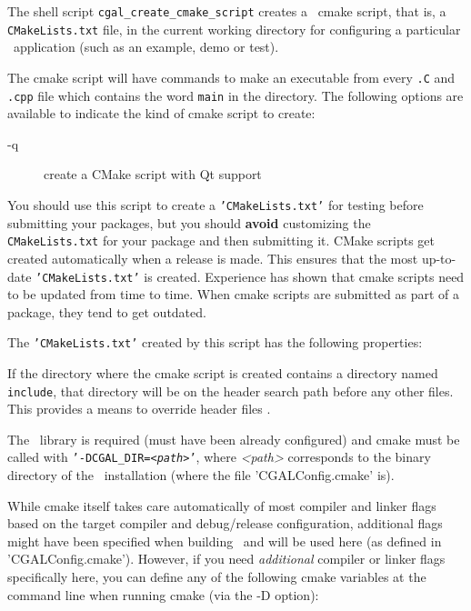 The shell script
{{\tt cgal\_create\_cmake\_script}} creates a \cgal\ cmake script, that is, a {\tt CMakeLists.txt} file,
in the current working directory for configuring a particular \cgal\ application (such as an example, demo or test).

The cmake script will have commands to make an executable from every {\tt .C}
and {\tt .cpp} file which contains the word {\tt main} in the directory.
The following options are available to indicate the kind of cmake script
to create:
\begin{description}
\item[-q]   create a CMake script with Qt support
\end{description}


You should use this script to create a {\tt 'CMakeLists.txt'} for testing before submitting
your packages, but you should {\bf avoid} customizing the {\tt CMakeLists.txt} for your
package and then submitting it. 
CMake scripts get created automatically when a release is made. This ensures
that the most up-to-date {\tt 'CMakeLists.txt'} is created. Experience has shown
that cmake scripts need to be updated from time to time. 
When cmake scripts are submitted as part of a package, they tend to get outdated.


The {\tt 'CMakeLists.txt'} created by this script has the following properties:

If the directory where the cmake script is created contains a directory named {\tt include},%
that directory will be on the header search path before any other files. This
provides a means to override header files%
.

The \cgal\ library is required (must have been already configured) and
cmake must be called with {\tt '-DCGAL\_DIR={\em <path>}'},
where {\em <path>} corresponds to the binary directory of the \cgal\ installation
(where the file 'CGALConfig.cmake' is).

While cmake itself takes care automatically of most compiler and linker flags based
on the target compiler and debug/release configuration, additional flags
might have been specified when building \cgal\ and will be used here
(as defined in 'CGALConfig.cmake'). However, if you
need {\em additional} compiler or linker flags specifically here,
you can define any of the following cmake variables at the command line
when running cmake (via the -D option):

